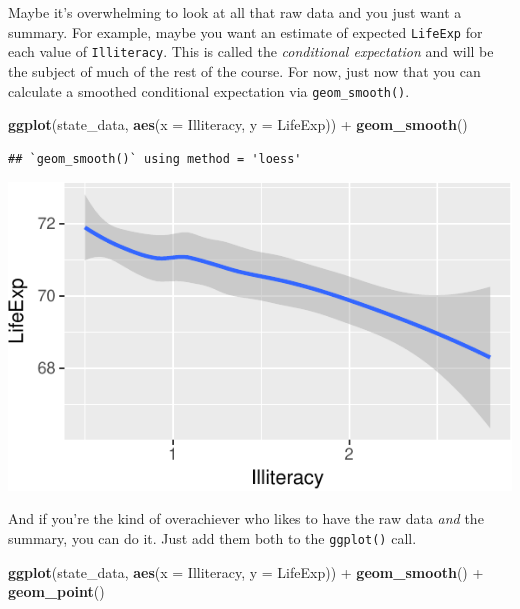 \documentclass[12pt,oneside,openany]{tufte-book}
\newenvironment{Shaded}{}{}
\newcommand{\KeywordTok}[1]{\textcolor[rgb]{0.00,0.44,0.13}{\textbf{{#1}}}}
\newcommand{\DataTypeTok}[1]{\textcolor[rgb]{0.56,0.13,0.00}{{#1}}}
\newcommand{\StringTok}[1]{\textcolor[rgb]{0.25,0.44,0.63}{{#1}}}
\newcommand{\NormalTok}[1]{{#1}}
\begin{document}
Maybe it's overwhelming to look at all that raw data and you just want a
summary. For example, maybe you want an estimate of expected
\texttt{LifeExp} for each value of \texttt{Illiteracy}. This is called
the \emph{conditional expectation} and will be the subject of much of
the rest of the course. For now, just now that you can calculate a
smoothed conditional expectation via \texttt{geom\_smooth()}.

\begin{Shaded}
\begin{Highlighting}[]
\KeywordTok{ggplot}\NormalTok{(state_data, }\KeywordTok{aes}\NormalTok{(}\DataTypeTok{x =} \NormalTok{Illiteracy, }\DataTypeTok{y =} \NormalTok{LifeExp)) +}\StringTok{ }
\StringTok{    }\KeywordTok{geom_smooth}\NormalTok{()}
\end{Highlighting}
\end{Shaded}

\begin{verbatim}
## `geom_smooth()` using method = 'loess'
\end{verbatim}

\includegraphics{pdaps_files/figure-latex/smooth-1}

And if you're the kind of overachiever who likes to have the raw data
\emph{and} the summary, you can do it. Just add them both to the
\texttt{ggplot()} call.

\begin{Shaded}
\begin{Highlighting}[]
\KeywordTok{ggplot}\NormalTok{(state_data, }\KeywordTok{aes}\NormalTok{(}\DataTypeTok{x =} \NormalTok{Illiteracy, }\DataTypeTok{y =} \NormalTok{LifeExp)) +}\StringTok{ }
\StringTok{    }\KeywordTok{geom_smooth}\NormalTok{() +}\StringTok{ }\KeywordTok{geom_point}\NormalTok{()}
\end{Highlighting}
\end{Shaded}
\end{document}
